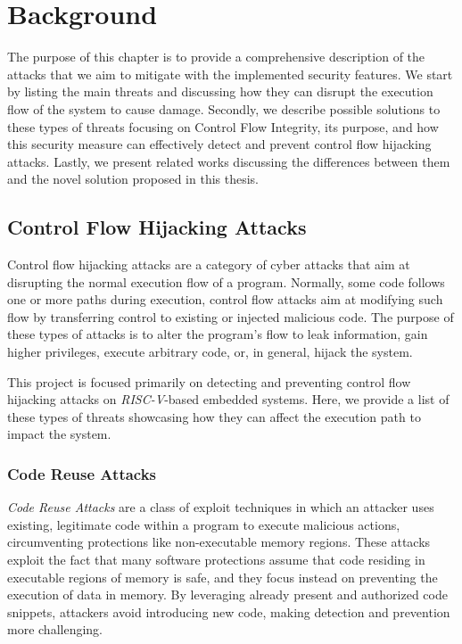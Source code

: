 \chapter{Background}
\label{cha:background}

The purpose of this chapter is to provide a comprehensive description of the
attacks that we aim to mitigate with the implemented security features. We start
by listing the main threats and discussing how they can disrupt the execution flow
of the system to cause damage. Secondly, we describe possible solutions to these
types of threats focusing on Control Flow Integrity, its purpose, and how this security
measure can effectively detect and prevent control flow hijacking attacks.
Lastly, we present related works discussing the differences between them and the
novel solution proposed in this thesis.

\section{Control Flow Hijacking Attacks}
\label{sec:background_cfa}

Control flow hijacking attacks are a category of cyber attacks that aim at
disrupting the normal execution flow of a program. Normally, some code follows
one or more paths during execution, control flow attacks aim at modifying such flow
by transferring control to existing or injected malicious code. The purpose of
these types of attacks is to alter the program's flow to leak information, gain higher
privileges, execute arbitrary code, or, in general, hijack the system.

This project is focused primarily on detecting and preventing control flow hijacking
attacks on \textit{RISC-V}-based embedded systems. Here, we provide a list of
these types of threats showcasing how they can affect the execution path to
impact the system.

\subsection{Code Reuse Attacks}
\label{subsec:background_codereuse}

\textit{Code Reuse Attacks} are a class of exploit techniques in which an
attacker uses existing, legitimate code within a program to execute malicious actions,
circumventing protections like non-executable memory regions. These attacks exploit
the fact that many software protections assume that code residing in executable regions
of memory is safe, and they focus instead on preventing the execution of data in
memory. By leveraging already present and authorized code snippets, attackers
avoid introducing new code, making detection and prevention more challenging.

